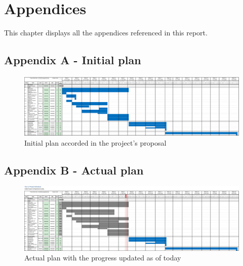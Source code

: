 %
%

\chapter{Appendices}

This chapter displays all the appendices referenced in this report.

\begin{landscape}
    \appendix    
    \section*{Appendix A - Initial plan}
    \label{app:initial_plan}
    \vspace{20mm}
    \begin{figure}[H]        
        \includegraphics[scale=0.3]{_figures/Project_initial_plan.eps}
        \caption{Initial plan accorded in the project's proposal}
    \end{figure}  
\end{landscape}

\begin{landscape}    
    \appendix
    \section*{Appendix B - Actual plan}
    \label{app:actual_plan}
    \vspace{20mm}
    \begin{figure}[H]        
        \includegraphics[scale=0.3]{_figures/Project_actual_plan.eps}        
        \caption{Actual plan with the progress updated as of today}
    \end{figure}  
\end{landscape}

